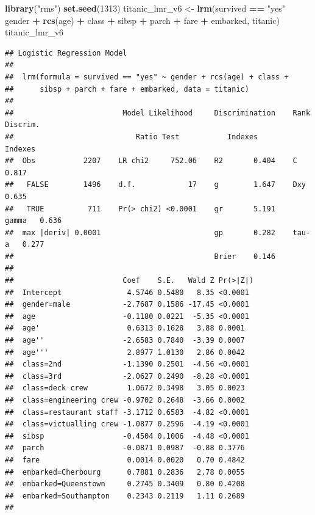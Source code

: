 \documentclass[12pt,]{krantz}
\newenvironment{Shaded}{\begin{snugshade}}{\end{snugshade}}
\newcommand{\DecValTok}[1]{\textcolor[rgb]{0.00,0.00,0.81}{#1}}
\newcommand{\KeywordTok}[1]{\textcolor[rgb]{0.13,0.29,0.53}{\textbf{#1}}}
\newcommand{\NormalTok}[1]{#1}
\newcommand{\OperatorTok}[1]{\textcolor[rgb]{0.81,0.36,0.00}{\textbf{#1}}}
\newcommand{\StringTok}[1]{\textcolor[rgb]{0.31,0.60,0.02}{#1}}
\begin{document}
\begin{Shaded}
\begin{Highlighting}[]
\KeywordTok{library}\NormalTok{(}\StringTok{"rms"}\NormalTok{)}
\KeywordTok{set.seed}\NormalTok{(}\DecValTok{1313}\NormalTok{)}
\NormalTok{titanic_lmr_v6 <-}\StringTok{ }\KeywordTok{lrm}\NormalTok{(survived }\OperatorTok{==}\StringTok{ "yes"} \OperatorTok{~}\StringTok{ }\NormalTok{gender }\OperatorTok{+}\StringTok{ }\KeywordTok{rcs}\NormalTok{(age) }\OperatorTok{+}\StringTok{ }\NormalTok{class }\OperatorTok{+}\StringTok{ }\NormalTok{sibsp }\OperatorTok{+}
\StringTok{                   }\NormalTok{parch }\OperatorTok{+}\StringTok{ }\NormalTok{fare }\OperatorTok{+}\StringTok{ }\NormalTok{embarked, titanic)}
\NormalTok{titanic_lmr_v6}
\end{Highlighting}
\end{Shaded}

\begin{verbatim}
## Logistic Regression Model
##  
##  lrm(formula = survived == "yes" ~ gender + rcs(age) + class + 
##      sibsp + parch + fare + embarked, data = titanic)
##  
##                         Model Likelihood     Discrimination    Rank Discrim.    
##                            Ratio Test           Indexes           Indexes       
##  Obs           2207    LR chi2     752.06    R2       0.404    C       0.817    
##   FALSE        1496    d.f.            17    g        1.647    Dxy     0.635    
##   TRUE          711    Pr(> chi2) <0.0001    gr       5.191    gamma   0.636    
##  max |deriv| 0.0001                          gp       0.282    tau-a   0.277    
##                                              Brier    0.146                     
##  
##                         Coef    S.E.   Wald Z Pr(>|Z|)
##  Intercept               4.5746 0.5480   8.35 <0.0001 
##  gender=male            -2.7687 0.1586 -17.45 <0.0001 
##  age                    -0.1180 0.0221  -5.35 <0.0001 
##  age'                    0.6313 0.1628   3.88 0.0001  
##  age''                  -2.6583 0.7840  -3.39 0.0007  
##  age'''                  2.8977 1.0130   2.86 0.0042  
##  class=2nd              -1.1390 0.2501  -4.56 <0.0001 
##  class=3rd              -2.0627 0.2490  -8.28 <0.0001 
##  class=deck crew         1.0672 0.3498   3.05 0.0023  
##  class=engineering crew -0.9702 0.2648  -3.66 0.0002  
##  class=restaurant staff -3.1712 0.6583  -4.82 <0.0001 
##  class=victualling crew -1.0877 0.2596  -4.19 <0.0001 
##  sibsp                  -0.4504 0.1006  -4.48 <0.0001 
##  parch                  -0.0871 0.0987  -0.88 0.3776  
##  fare                    0.0014 0.0020   0.70 0.4842  
##  embarked=Cherbourg      0.7881 0.2836   2.78 0.0055  
##  embarked=Queenstown     0.2745 0.3409   0.80 0.4208  
##  embarked=Southampton    0.2343 0.2119   1.11 0.2689  
## 
\end{verbatim}
\end{document}
